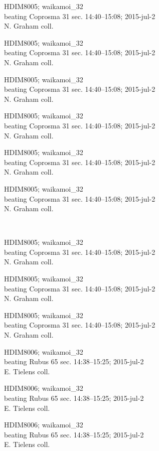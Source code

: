 \documentclass[2pt]{extarticle}
\begin{document}
\noindent
\parbox{0.16\textwidth}{\tiny \raggedright \rule[-0.3\baselineskip]{0pt}{10pt}HDIM8005; waikamoi\_32\\ beating Coprosma 31 sec. 14:40--15:08; 2015-jul-2\\ N. Graham coll.}
\parbox{0.16\textwidth}{\tiny \raggedright \rule[-0.3\baselineskip]{0pt}{10pt}HDIM8005; waikamoi\_32\\ beating Coprosma 31 sec. 14:40--15:08; 2015-jul-2\\ N. Graham coll.}
\parbox{0.16\textwidth}{\tiny \raggedright \rule[-0.3\baselineskip]{0pt}{10pt}HDIM8005; waikamoi\_32\\ beating Coprosma 31 sec. 14:40--15:08; 2015-jul-2\\ N. Graham coll.}
\parbox{0.16\textwidth}{\tiny \raggedright \rule[-0.3\baselineskip]{0pt}{10pt}HDIM8005; waikamoi\_32\\ beating Coprosma 31 sec. 14:40--15:08; 2015-jul-2\\ N. Graham coll.}
\parbox{0.16\textwidth}{\tiny \raggedright \rule[-0.3\baselineskip]{0pt}{10pt}HDIM8005; waikamoi\_32\\ beating Coprosma 31 sec. 14:40--15:08; 2015-jul-2\\ N. Graham coll.}
\parbox{0.16\textwidth}{\tiny \raggedright \rule[-0.3\baselineskip]{0pt}{10pt}HDIM8005; waikamoi\_32\\ beating Coprosma 31 sec. 14:40--15:08; 2015-jul-2\\ N. Graham coll.} \\ 
\vspace{0.001in} 

\noindent
\parbox{0.16\textwidth}{\tiny \raggedright \rule[-0.3\baselineskip]{0pt}{10pt}HDIM8005; waikamoi\_32\\ beating Coprosma 31 sec. 14:40--15:08; 2015-jul-2\\ N. Graham coll.}
\parbox{0.16\textwidth}{\tiny \raggedright \rule[-0.3\baselineskip]{0pt}{10pt}HDIM8005; waikamoi\_32\\ beating Coprosma 31 sec. 14:40--15:08; 2015-jul-2\\ N. Graham coll.}
\parbox{0.16\textwidth}{\tiny \raggedright \rule[-0.3\baselineskip]{0pt}{10pt}HDIM8005; waikamoi\_32\\ beating Coprosma 31 sec. 14:40--15:08; 2015-jul-2\\ N. Graham coll.}
\parbox{0.16\textwidth}{\tiny \raggedright \rule[-0.3\baselineskip]{0pt}{10pt}HDIM8006; waikamoi\_32\\ beating Rubus 65 sec. 14:38--15:25; 2015-jul-2\\ E. Tielens coll.}
\parbox{0.16\textwidth}{\tiny \raggedright \rule[-0.3\baselineskip]{0pt}{10pt}HDIM8006; waikamoi\_32\\ beating Rubus 65 sec. 14:38--15:25; 2015-jul-2\\ E. Tielens coll.}
\parbox{0.16\textwidth}{\tiny \raggedright \rule[-0.3\baselineskip]{0pt}{10pt}HDIM8006; waikamoi\_32\\ beating Rubus 65 sec. 14:38--15:25; 2015-jul-2\\ E. Tielens coll.} \\ 
\vspace{0.001in} 
\end{document}
